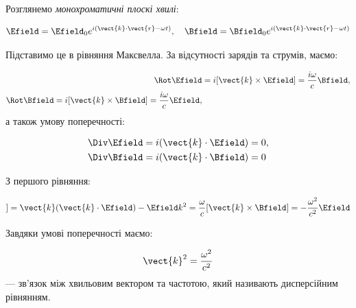 Розглянемо \emph{монохроматичні плоскі хвилі}:

\begin{equation*}
	\Efield = \Efield_0 e^{i(\vect{k} \cdot \vect{r} - \omega t)}, \quad \Bfield = \Bfield_0 e^{i(\vect{k} \cdot \vect{r} - \omega t)}
	\label{eq:monochromatic_waves}
\end{equation*}

Підставимо це в рівняння Максвелла. За відсутності зарядів та струмів, маємо:

\begin{align*}
	\Rot\Efield & = i[\vect{k} \times \Efield] = \frac{i\omega}{c} \Bfield, \\
	\Rot\Bfield = i[\vect{k} \times \Bfield] = \frac{i\omega}{c} \Efield,
\end{align*}
а також умову поперечності:

\begin{align*}
	\Div\Efield & = i(\vect{k} \cdot \Efield) = 0, \\
	\Div\Bfield & = i(\vect{k} \cdot \Bfield) = 0
\end{align*}

З першого рівняння:

\begin{equation*}
	[\vect{k} \times [\vect{k} \times \Efield]] = \vect{k}(\vect{k} \cdot \Efield) - \Efield k^2 = \frac{\omega}{c}[\vect{k} \times \Bfield] =
	-\frac{\omega^2}{c^2} \Efield
\end{equation*}

Завдяки умові поперечності маємо:

\begin{equation*}
	\vect{k}^2 = \frac{\omega^2}{c^2}
	\label{eq:dispersion_relation}
\end{equation*}
--- зв'язок між хвильовим вектором та частотою, який називають дисперсійним рівнянням.

